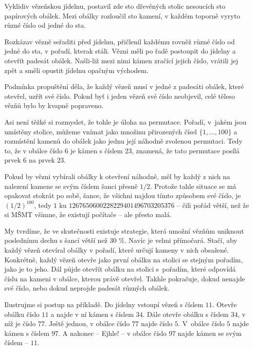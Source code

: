 Vyklidiv vězeňskou jídelnu, postavil zde sto dřevěných stolic nesoucích sto
papírových obálek. Mezi obálky rozloučil sto kamení, v každém toporně vyryto
různé číslo od jedné do sta.

Rozkázav vězně seřaditi před jídelnu, přičlenil každému rovněž různé číslo od
jedné do sta, v pořadí, kterak stáli. Vězni měli po řadě postoupit do jídelny a
otevřít padesát obálek. Našli-liž mezi nimi kámen zračící jejich číslo, vrátili
jej zpět a směli opustit jídelnu opačným východem.

Podmínka propuštění děla, že každý vězeň musí v jedné z padesáti obálek, které
otevřel, uzřít své číslo. Pokud byť i jeden vězeň své číslo neobjevil, celé
těleso vězňů bylo by kvapně popraveno.

Asi není těžké si rozmyslet, že tohle je úloha na permutace. Pořadí, v~jakém
jsou umístěny stolice, můžeme vnímat jako množinu přirozených čísel
$\{1,\ldots,100\}$ a rozmístění kamenů do obálek jako jednu její náhodně
zvolenou permutaci. Tedy to, že v obálce číslo $6$ je kámen s číslem $23$,
znamená, že tato permutace posílá prvek $6$ na prvek $23$.

Pokud by vězni vybírali obálky k otevření náhodně, měl by každý z nich na
nalezení kamene se svým číslem šanci přesně $1 / 2$. Protože tahle situace se má
opakovat stokrát po sobě, šance, že všichni najdou tímto způsobem své číslo, je
$(1 / 2)^{100}$, tedy $1$ ku $1 267 650 600 228 229 401 496 703 205 376$ -- čili
pořád větší, než že si MŠMT všimne, že existují počítače -- ale přesto malá.

My tvrdíme, že ve skutečnosti existuje strategie, která umožní vězňům uniknout
poslednímu dechu s šancí větší než 30 \%. Navíc je velmi přímočará. Stačí, aby
každý vězeň otevíral obálky v pořadí, které určují kameny v nich obsažené.
Konkrétně, každý vězeň otevře jako první obálku na stolici se stejným pořadím,
jako je to jeho. Dál půjde otevřít obálku na stolici s~pořadím, které odpovídá
číslu na kameni v obálce, kterou právě otevřel. Takhle pokračuje, dokud nenajde
své číslo, nebo dokud neprojde padesát různých obálek.

Ilustrujme si postup na příkladě. Do jídelny vstoupí vězeň s číslem $11$. Otevře
obálku číslo $11$ a najde v ní kámen s číslem $34$. Dále otevře obálku s číslem
$34$, v níž je číslo $77$. Ještě jednou, v obálce číslo $77$ najde číslo $5$.
V~obálce číslo $5$ najde kámen s číslem $97$. A nakonec -- Ejhle! -- v obálce
číslo $97$ najde kámen se svým číslem -- $11$.

